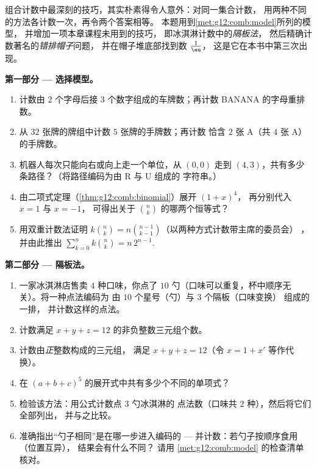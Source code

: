 \begin{problem}
\label{pb:g12:comb:1}
组合计数中最深刻的技巧，其实朴素得令人意外：对同一集合计数，
用两种不同的方法各计数一次，再令两个答案相等。
本题用到\cref{met:g12:comb:model}所列的模型，
并增加一项本章课程未用到的技巧，
即冰淇淋计数中的\emph{隔板法}，
然后精确计数著名的\emph{错排帽子}问题，
并在帽子堆底部找到数 $\frac1\eu$，
这是它在本书中第三次出现。

\medskip
\noindent\textbf{第一部分 --- 选择模型。}
\begin{enumerate}
  \item 计数由 $2$ 个字母后接
        $3$ 个数字组成的车牌数；再计数 BANANA 的字母重排数。
  \item 从 $32$ 张牌的牌组中计数 $5$ 张牌的手牌数；再计数
        恰含 $2$ 张 A（共 $4$ 张 A）的手牌数。
  \item 机器人每次只能向右或向上走一个单位，从 $(0,0)$ 走到
        $(4,3)$，共有多少条路径？（将路径编码为由 R 与 U 组成的
        字符串。）
  \item 由二项式定理（\cref{thm:g12:comb:binomial}）展开 $(1 + x)^4$，
        再分别代入 $x = 1$ 与 $x = -1$，
        可得出关于
        $\binom nk$ 的哪两个恒等式？
  \item 用双重计数法证明
        $k\binom nk = n\binom{n-1}{k-1}$（以两种方式计数带主席的委员会）
        ，并由此推出
        $\sum_{k=0}^{n} k\binom nk = n\,2^{n-1}$.
\end{enumerate}

\medskip
\noindent\textbf{第二部分 --- 隔板法。}
\begin{enumerate}[resume]
  \item 一家冰淇淋店售卖 $4$ 种口味，你点了 $10$
        勺（口味可以重复，杯中顺序无关）。将一种点法编码为
        由 $10$ 个星号（勺）与 $3$ 个隔板（口味变换）
        组成的一排，
        并计数这样的点法。
  \item 计数满足
        $x + y + z = 12$ 的非负整数三元组个数。
  \item 计数由\emph{正}整数构成的三元组，
        满足 $x + y + z = 12$（令 $x = 1 + x'$ 等作代换）。
  \item 在
        $(a + b + c)^5$ 的展开式中共有多少个不同的单项式？
  \item 检验该方法：用公式计数点 $3$ 勺冰淇淋的
        点法数（口味共 $2$ 种），然后将它们全部列出，
        并与之比较。
  \item 准确指出“勺子相同”是在哪一步进入编码的 ---
        并计数：若勺子按顺序食用（位置互异），
        结果会有什么不同？
        请用 \cref{met:g12:comb:model} 的检查清单核对。
\end{enumerate}


\end{problem}
